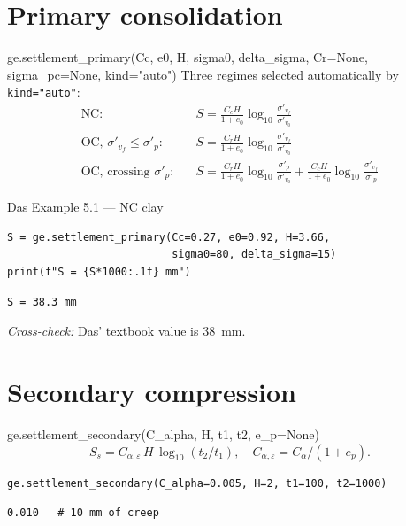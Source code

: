 \documentclass[11pt,a4paper,openany]{book}
\newcommand{\sigmavp}{\sigma'_v}
\begin{document}
\section{Primary consolidation}

\begin{funcbox}{ge.settlement\_primary(Cc, e0, H, sigma0, delta\_sigma, Cr=None, sigma\_pc=None, kind="auto")}
Three regimes selected automatically by \texttt{kind="auto"}:
\begin{equation}
\begin{aligned}
\text{NC:}\;\;\;       & S = \tfrac{C_c H}{1+e_0}\log_{10}\tfrac{\sigmavp_f}{\sigmavp_0}\\
\text{OC, } \sigmavp_f \leq \sigma'_p:\;\;\; &
   S = \tfrac{C_r H}{1+e_0}\log_{10}\tfrac{\sigmavp_f}{\sigmavp_0}\\
\text{OC, crossing }\sigma'_p:\;\;\;&
   S = \tfrac{C_r H}{1+e_0}\log_{10}\tfrac{\sigma'_p}{\sigmavp_0}
     + \tfrac{C_c H}{1+e_0}\log_{10}\tfrac{\sigmavp_f}{\sigma'_p}
\end{aligned}
\end{equation}
\end{funcbox}

\begin{worked}{Das Example 5.1 --- NC clay}
\begin{lstlisting}
S = ge.settlement_primary(Cc=0.27, e0=0.92, H=3.66,
                          sigma0=80, delta_sigma=15)
print(f"S = {S*1000:.1f} mm")
\end{lstlisting}
\begin{lstlisting}[style=output]
S = 38.3 mm
\end{lstlisting}
\textit{Cross-check:} Das' textbook value is 38~mm.
\end{worked}

\section{Secondary compression}

\begin{funcbox}{ge.settlement\_secondary(C\_alpha, H, t1, t2, e\_p=None)}
\[
S_s = C_{\alpha,\varepsilon}\,H\,\log_{10}(t_2 / t_1),
\quad C_{\alpha,\varepsilon} = C_\alpha / (1 + e_p).
\]
\end{funcbox}

\begin{lstlisting}
ge.settlement_secondary(C_alpha=0.005, H=2, t1=100, t2=1000)
\end{lstlisting}
\begin{lstlisting}[style=output]
0.010   # 10 mm of creep
\end{lstlisting}
\end{document}
